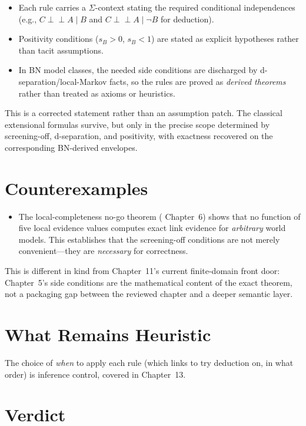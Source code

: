 \documentclass[11pt,openany]{report}
\begin{document}
\begin{itemize}
\item Each rule carries a $\Sigma$-context stating the required
  conditional independences (e.g., $C \perp\!\!\!\perp A \mid B$ and
  $C \perp\!\!\!\perp A \mid \lnot B$ for deduction).
\item Positivity conditions ($s_B > 0$, $s_B < 1$) are stated as
  explicit hypotheses rather than tacit assumptions.
\item In BN model classes, the needed side conditions are discharged by
  d-separation/local-Markov facts, so the rules are proved as
  \emph{derived theorems} rather than treated as axioms or heuristics.
\end{itemize}

This is a corrected statement rather than an assumption patch.  The
classical extensional formulas survive, but only in the precise scope
determined by screening-off, d-separation, and positivity, with
exactness recovered on the corresponding BN-derived envelopes.

\section{Counterexamples}

\begin{itemize}
\item The local-completeness no-go theorem (\xiPLN{} Chapter~6) shows
  that no function of five local evidence values computes exact link
  evidence for \emph{arbitrary} world models.  This establishes that
  the screening-off conditions are not merely convenient---they are
  \emph{necessary} for correctness.
\end{itemize}

This is different in kind from Chapter~11's current finite-domain front
door: Chapter~5's side conditions are the mathematical content of the
exact theorem, not a packaging gap between the reviewed chapter and a
deeper semantic layer.

\section{What Remains Heuristic}

The choice of \emph{when} to apply each rule (which links to try
deduction on, in what order) is inference control, covered in
Chapter~13.

\section{Verdict}
\end{document}
